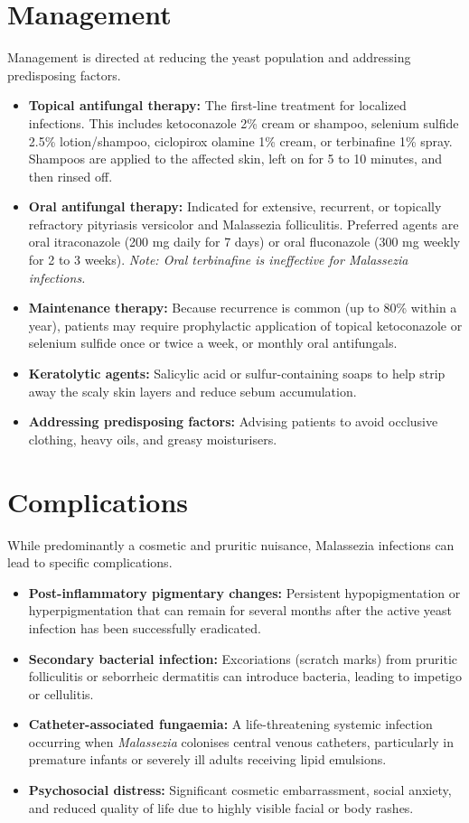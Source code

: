 \section*{Management}
Management is directed at reducing the yeast population and addressing predisposing factors.
\begin{itemize}
    \item \textbf{Topical antifungal therapy:} The first-line treatment for localized infections. This includes ketoconazole 2\% cream or shampoo, selenium sulfide 2.5\% lotion/shampoo, ciclopirox olamine 1\% cream, or terbinafine 1\% spray. Shampoos are applied to the affected skin, left on for 5 to 10 minutes, and then rinsed off.
    \item \textbf{Oral antifungal therapy:} Indicated for extensive, recurrent, or topically refractory pityriasis versicolor and Malassezia folliculitis. Preferred agents are oral itraconazole (200 mg daily for 7 days) or oral fluconazole (300 mg weekly for 2 to 3 weeks). \textit{Note: Oral terbinafine is ineffective for Malassezia infections.}
    \item \textbf{Maintenance therapy:} Because recurrence is common (up to 80\% within a year), patients may require prophylactic application of topical ketoconazole or selenium sulfide once or twice a week, or monthly oral antifungals.
    \item \textbf{Keratolytic agents:} Salicylic acid or sulfur-containing soaps to help strip away the scaly skin layers and reduce sebum accumulation.
    \item \textbf{Addressing predisposing factors:} Advising patients to avoid occlusive clothing, heavy oils, and greasy moisturisers.
\end{itemize}

\section*{Complications}
While predominantly a cosmetic and pruritic nuisance, Malassezia infections can lead to specific complications.
\begin{itemize}
    \item \textbf{Post-inflammatory pigmentary changes:} Persistent hypopigmentation or hyperpigmentation that can remain for several months after the active yeast infection has been successfully eradicated.
    \item \textbf{Secondary bacterial infection:} Excoriations (scratch marks) from pruritic folliculitis or seborrheic dermatitis can introduce bacteria, leading to impetigo or cellulitis.
    \item \textbf{Catheter-associated fungaemia:} A life-threatening systemic infection occurring when \textit{Malassezia} colonises central venous catheters, particularly in premature infants or severely ill adults receiving lipid emulsions.
    \item \textbf{Psychosocial distress:} Significant cosmetic embarrassment, social anxiety, and reduced quality of life due to highly visible facial or body rashes.
\end{itemize}

